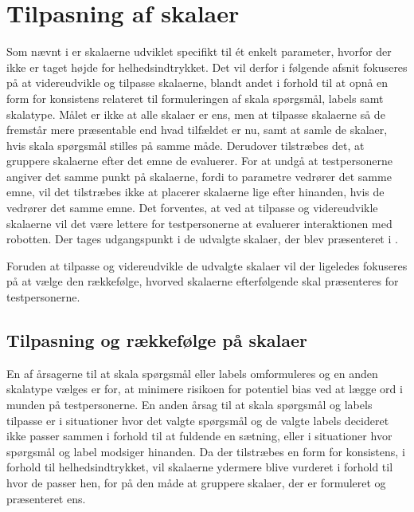 \chapter{Tilpasning af skalaer}
\label{TestAfSkalaTilpasningAfSkalaer}
%
Som nævnt i  er skalaerne udviklet specifikt til ét enkelt parameter, hvorfor der ikke er taget højde for helhedsindtrykket. Det vil derfor i følgende afsnit fokuseres på at videreudvikle og tilpasse skalaerne, blandt andet i forhold til at opnå en form for konsistens relateret til formuleringen af skala spørgsmål, labels samt skalatype. Målet er ikke at alle skalaer er ens, men at tilpasse skalaerne så de fremstår mere præsentable end hvad tilfældet er nu, samt at samle de skalaer, hvis skala spørgsmål stilles på samme måde. Derudover tilstræbes det, at gruppere skalaerne efter det emne de evaluerer. For at undgå at testpersonerne angiver det samme punkt på skalaerne, fordi to parametre vedrører det samme emne, vil det tilstræbes ikke at placerer skalaerne lige efter hinanden, hvis de vedrører det samme emne. Det forventes, at ved at tilpasse og videreudvikle skalaerne vil det være lettere for testpersonerne at evaluerer interaktionen med robotten. Der tages udgangspunkt i de udvalgte skalaer, der blev præsenteret i .

Foruden at tilpasse og videreudvikle de udvalgte skalaer vil der ligeledes fokuseres på at vælge den rækkefølge, hvorved skalaerne efterfølgende skal præsenteres for testpersonerne.    
%
\section{Tilpasning og rækkefølge på skalaer}
\label{TilpasningSkalaer}
%
En af årsagerne til at skala spørgsmål eller labels omformuleres og en anden skalatype vælges er for, at minimere risikoen for potentiel bias ved at lægge ord i munden på testpersonerne. En anden årsag til at skala spørgsmål og labels tilpasse er i situationer hvor det valgte spørgsmål og de valgte labels decideret ikke passer sammen i forhold til at fuldende en sætning, eller i situationer hvor spørgsmål og label modsiger hinanden. Da der tilstræbes en form for konsistens, i forhold til helhedsindtrykket, vil skalaerne ydermere blive vurderet i forhold til hvor de passer hen, for på den måde at gruppere skalaer, der er formuleret og præsenteret ens. 

